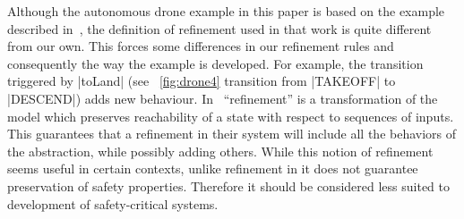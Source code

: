 Although the autonomous drone example in this paper is based on the
example described in~\cite{Syriani_2019}, the definition of refinement
used in that work is quite different from our own. This forces some
differences in our refinement rules and consequently the way the
example is developed. For example, the transition triggered by |toLand| 
(see ~\ref{fig:drone4} transition from |TAKEOFF| to |DESCEND|) 
adds new behaviour.
In~\cite{Syriani_2019} ``refinement'' is a
transformation of the model which preserves reachability of a state
with respect to sequences of inputs. This guarantees that a refinement
in their system will include all the behaviors of the abstraction,
while possibly adding others. While this notion of refinement seems
useful in certain contexts, unlike refinement in \EventB it does not
guarantee preservation of safety properties. Therefore it should be
considered less suited to development of safety-critical systems.

